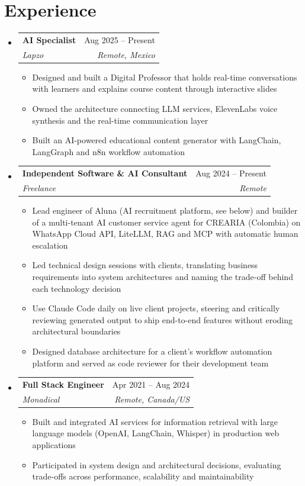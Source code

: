 \documentclass[letterpaper,10pt]{article}
\makeatletter
\newcommand{\resumeSubheading}[4]{
  \vspace{-2pt}
  \item[]
  \begin{tabular*}{\textwidth}{@{\extracolsep{\fill}}l r}
    \textbf{#1} & #2 \\
    \textit{#3} & \textit{#4} \\
  \end{tabular*}
  \vspace{-5pt}
}
\makeatother
\begin{document}
\section{Experience}
\begin{itemize}[leftmargin=0pt, itemindent=0pt, label={}, itemsep=1pt]
\resumeSubheading
{AI Specialist}{Aug 2025 -- Present}
{Lapzo}{Remote, Mexico}
\begin{itemize}[leftmargin=*, itemsep=0pt]
    \item Designed and built a Digital Professor that holds real-time conversations with learners and explains course content through interactive slides
    \item Owned the architecture connecting LLM services, ElevenLabs voice synthesis and the real-time communication layer
    \item Built an AI-powered educational content generator with LangChain, LangGraph and n8n workflow automation
\end{itemize}
\resumeSubheading
{Independent Software \& AI Consultant}{Aug 2024 -- Present}
{Freelance}{Remote}
\begin{itemize}[leftmargin=*, itemsep=0pt]
    \item Lead engineer of Aluna (AI recruitment platform, see below) and builder of a multi-tenant AI customer service agent for CREARIA (Colombia) on WhatsApp Cloud API, LiteLLM, RAG and MCP with automatic human escalation
    \item Led technical design sessions with clients, translating business requirements into system architectures and naming the trade-off behind each technology decision
    \item Use Claude Code daily on live client projects, steering and critically reviewing generated output to ship end-to-end features without eroding architectural boundaries
    \item Designed database architecture for a client's workflow automation platform and served as code reviewer for their development team
\end{itemize}
\resumeSubheading
{Full Stack Engineer}{Apr 2021 -- Aug 2024}
{Monadical}{Remote, Canada/US}
\begin{itemize}[leftmargin=*, itemsep=0pt]
    \item Built and integrated AI services for information retrieval with large language models (OpenAI, LangChain, Whisper) in production web applications
    \item Participated in system design and architectural decisions, evaluating trade-offs across performance, scalability and maintainability

\end{itemize}
\end{itemize}
\end{document}
